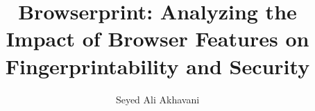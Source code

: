 \documentclass[sigconf, anonymous]{acmart}
\begin{document}
\title{Browserprint: Analyzing the Impact of Browser Features on Fingerprintability and Security}

\author[1]{Seyed Ali Akhavani}



\maketitle

% 


% 





\end{document}
